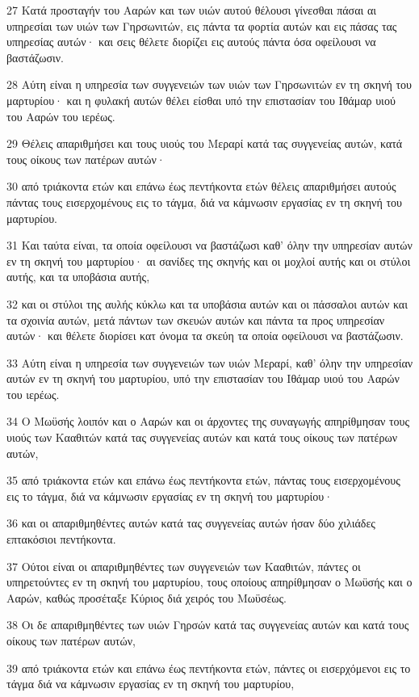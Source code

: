 \par 27 Κατά προσταγήν του Ααρών και των υιών αυτού θέλουσι γίνεσθαι πάσαι αι υπηρεσίαι των υιών των Γηρσωνιτών, εις πάντα τα φορτία αυτών και εις πάσας τας υπηρεσίας αυτών· και σεις θέλετε διορίζει εις αυτούς πάντα όσα οφείλουσι να βαστάζωσιν.
\par 28 Αύτη είναι η υπηρεσία των συγγενειών των υιών των Γηρσωνιτών εν τη σκηνή του μαρτυρίου· και η φυλακή αυτών θέλει είσθαι υπό την επιστασίαν του Ιθάμαρ υιού του Ααρών του ιερέως.
\par 29 Θέλεις απαριθμήσει και τους υιούς του Μεραρί κατά τας συγγενείας αυτών, κατά τους οίκους των πατέρων αυτών·
\par 30 από τριάκοντα ετών και επάνω έως πεντήκοντα ετών θέλεις απαριθμήσει αυτούς πάντας τους εισερχομένους εις το τάγμα, διά να κάμνωσιν εργασίας εν τη σκηνή του μαρτυρίου.
\par 31 Και ταύτα είναι, τα οποία οφείλουσι να βαστάζωσι καθ' όλην την υπηρεσίαν αυτών εν τη σκηνή του μαρτυρίου· αι σανίδες της σκηνής και οι μοχλοί αυτής και οι στύλοι αυτής, και τα υποβάσια αυτής,
\par 32 και οι στύλοι της αυλής κύκλω και τα υποβάσια αυτών και οι πάσσαλοι αυτών και τα σχοινία αυτών, μετά πάντων των σκευών αυτών και πάντα τα προς υπηρεσίαν αυτών· και θέλετε διορίσει κατ όνομα τα σκεύη τα οποία οφείλουσι να βαστάζωσιν.
\par 33 Αύτη είναι η υπηρεσία των συγγενειών των υιών Μεραρί, καθ' όλην την υπηρεσίαν αυτών εν τη σκηνή του μαρτυρίου, υπό την επιστασίαν του Ιθάμαρ υιού του Ααρών του ιερέως.
\par 34 Ο Μωϋσής λοιπόν και ο Ααρών και οι άρχοντες της συναγωγής απηρίθμησαν τους υιούς των Κααθιτών κατά τας συγγενείας αυτών και κατά τους οίκους των πατέρων αυτών,
\par 35 από τριάκοντα ετών και επάνω έως πεντήκοντα ετών, πάντας τους εισερχομένους εις το τάγμα, διά να κάμνωσιν εργασίας εν τη σκηνή του μαρτυρίου·
\par 36 και οι απαριθμηθέντες αυτών κατά τας συγγενείας αυτών ήσαν δύο χιλιάδες επτακόσιοι πεντήκοντα.
\par 37 Ούτοι είναι οι απαριθμηθέντες των συγγενειών των Κααθιτών, πάντες οι υπηρετούντες εν τη σκηνή του μαρτυρίου, τους οποίους απηρίθμησαν ο Μωϋσής και ο Ααρών, καθώς προσέταξε Κύριος διά χειρός του Μωϋσέως.
\par 38 Οι δε απαριθμηθέντες των υιών Γηρσών κατά τας συγγενείας αυτών και κατά τους οίκους των πατέρων αυτών,
\par 39 από τριάκοντα ετών και επάνω έως πεντήκοντα ετών, πάντες οι εισερχόμενοι εις το τάγμα διά να κάμνωσιν εργασίας εν τη σκηνή του μαρτυρίου,
